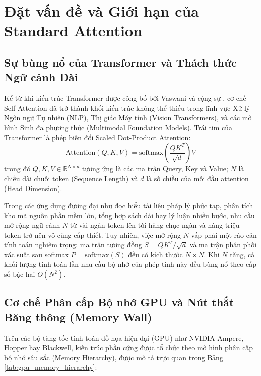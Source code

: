 \documentclass[10pt,a4paper]{article}
\begin{document}
\section{Đặt vấn đề và Giới hạn của Standard Attention}
\label{sec:intro}

\subsection{Sự bùng nổ của Transformer và Thách thức Ngữ cảnh Dài}
Kể từ khi kiến trúc Transformer được công bố bởi Vaswani và cộng sự \cite{vaswani2017attention}, cơ chế Self-Attention đã trở thành khối kiến trúc không thể thiếu trong lĩnh vực Xử lý Ngôn ngữ Tự nhiên (NLP), Thị giác Máy tính (Vision Transformers), và các mô hình Sinh đa phương thức (Multimodal Foundation Models). Trái tim của Transformer là phép biến đổi Scaled Dot-Product Attention:
\begin{equation}
\label{eq:standard_attn}
\text{Attention}(Q, K, V) = \text{softmax}\left(\frac{QK^T}{\sqrt{d}}\right)V
\end{equation}
trong đó $Q, K, V \in \mathbb{R}^{N \times d}$ tương ứng là các ma trận Query, Key và Value; $N$ là chiều dài chuỗi token (Sequence Length) và $d$ là số chiều của mỗi đầu attention (Head Dimension).

Trong các ứng dụng đương đại như đọc hiểu tài liệu pháp lý phức tạp, phân tích kho mã nguồn phần mềm lớn, tổng hợp sách dài hay lý luận nhiều bước, nhu cầu mở rộng ngữ cảnh $N$ từ vài ngàn token lên tới hàng chục ngàn và hàng triệu token trở nên vô cùng cấp thiết. Tuy nhiên, việc mở rộng $N$ vấp phải một rào cản tính toán nghiêm trọng: ma trận tương đồng $S = QK^T / \sqrt{d}$ và ma trận phân phối xác suất sau softmax $P = \text{softmax}(S)$ đều có kích thước $N \times N$. Khi $N$ tăng, cả khối lượng tính toán lẫn nhu cầu bộ nhớ của phép tính này đều bùng nổ theo cấp số bậc hai $O(N^2)$.

\subsection{Cơ chế Phân cấp Bộ nhớ GPU và Nút thắt Băng thông (Memory Wall)}
Trên các bộ tăng tốc tính toán đồ họa hiện đại (GPU) như NVIDIA Ampere, Hopper hay Blackwell, kiến trúc phần cứng được tổ chức theo mô hình phân cấp bộ nhớ sâu sắc (Memory Hierarchy), được mô tả trực quan trong Bảng \ref{tab:gpu_memory_hierarchy}:
\end{document}
